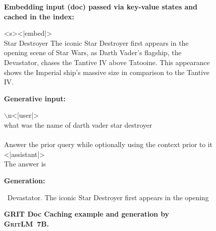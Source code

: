 \documentclass{article}
\newcommand{\modelbase}{\textsc{GritLM~7B}}
\newcommand{\method}{\textsc{GRIT}}
\begin{document}
\begin{figure}[htbp]
\hrulefill

\textbf{Embedding input (doc) passed via key-value states and cached in the index:}

\hrulefill

<s><|embed|>\\
Star Destroyer The iconic Star Destroyer first appears in the opening scene of Star Wars, as Darth Vader's flagship, the Devastator, chases the Tantive IV above Tatooine. This appearance shows the Imperial ship's massive size in comparison to the Tantive IV.

\hrulefill

\textbf{Generative input:}

\hrulefill

$\backslash$n<|user|>\\
what was the name of darth vader star destroyer\\\\
Answer the prior query while optionally using the context prior to it\\
<|assistant|>\\
The answer is

\hrulefill

\textbf{Generation:}

\hrulefill

~Devastator. The iconic Star Destroyer first appears in the opening

\hrulefill

\caption{\textbf{\method{} Doc Caching example and generation by \modelbase{}.}}
\label{fig:ragd}
\end{figure}
\end{document}
